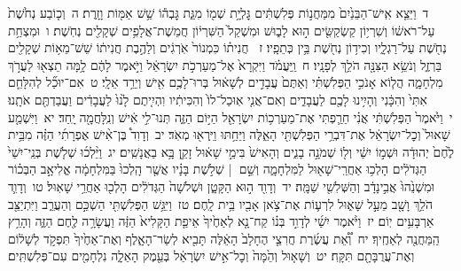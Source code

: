 \documentclass[18pt]{article}
\newcommand{\kri}[1]{\Afootnote{#1}}	%
\begin{document}
 {\loc ד~}וַיֵּצֵ֤א אִֽישׁ־הַבֵּנַ֙יִם֙ מִמַּחֲנ֣וֹת פְּלִשְׁתִּ֔ים גׇּלְיָ֥ת שְׁמ֖וֹ מִגַּ֑ת גׇּבְה֕וֹ שֵׁ֥שׁ אַמּ֖וֹת וָזָֽרֶת׃ \startlock
 {\loc ה~}וְכ֤וֹבַע נְחֹ֙שֶׁת֙ עַל־רֹאשׁ֔וֹ וְשִׁרְי֥וֹן קַשְׂקַשִּׂ֖ים ה֣וּא לָב֑וּשׁ וּמִשְׁקַל֙ הַשִּׁרְי֔וֹן חֲמֵשֶׁת־אֲלָפִ֥ים שְׁקָלִ֖ים נְחֹֽשֶׁת׃ \startlock
 {\loc ו~}וּמִצְחַ֥ת נְחֹ֖שֶׁת עַל־רַגְלָ֑יו וְכִיד֥וֹן נְחֹ֖שֶׁת בֵּ֥ין כְּתֵפָֽיו׃ \startlock
 {\loc ז~}\edtext{(וחץ)}{\kri{קרי: וְעֵ֣ץ}}  חֲנִית֗וֹ כִּמְנוֹר֙ אֹֽרְגִ֔ים וְלַהֶ֣בֶת חֲנִית֔וֹ שֵׁשׁ־מֵא֥וֹת שְׁקָלִ֖ים בַּרְזֶ֑ל וְנֹשֵׂ֥א הַצִּנָּ֖ה הֹלֵ֥ךְ לְפָנָֽיו׃ \startlock
 {\loc ח~}וַֽיַּעֲמֹ֗ד וַיִּקְרָא֙ אֶל־מַעַרְכֹ֣ת יִשְׂרָאֵ֔ל וַיֹּ֣אמֶר לָהֶ֔ם לָ֥מָּה תֵצְא֖וּ לַעֲרֹ֣ךְ מִלְחָמָ֑ה הֲל֧וֹא אָנֹכִ֣י הַפְּלִשְׁתִּ֗י וְאַתֶּם֙ עֲבָדִ֣ים לְשָׁא֔וּל בְּרוּ־לָכֶ֥ם אִ֖ישׁ וְיֵרֵ֥ד אֵלָֽי׃ \startlock
 {\loc ט~}אִם־יוּכַ֞ל לְהִלָּחֵ֤ם אִתִּי֙ וְהִכָּ֔נִי וְהָיִ֥ינוּ לָכֶ֖ם לַעֲבָדִ֑ים וְאִם־אֲנִ֤י אֽוּכַל־לוֹ֙ וְהִכִּיתִ֔יו וִהְיִ֤יתֶם לָ֙נוּ֙ לַעֲבָדִ֔ים וַעֲבַדְתֶּ֖ם אֹתָֽנוּ׃ \startlock
 {\loc י~}וַיֹּ֙אמֶר֙ הַפְּלִשְׁתִּ֔י אֲנִ֗י חֵרַ֛פְתִּי אֶת־מַעַרְכ֥וֹת יִשְׂרָאֵ֖ל הַיּ֣וֹם הַזֶּ֑ה תְּנוּ־לִ֣י אִ֔ישׁ וְנִֽלָּחֲמָ֖ה יָֽחַד׃ \startlock
 {\loc יא~}וַיִּשְׁמַ֤ע שָׁאוּל֙ וְכׇל־יִשְׂרָאֵ֔ל אֶת־דִּבְרֵ֥י הַפְּלִשְׁתִּ֖י הָאֵ֑לֶּה וַיֵּחַ֥תּוּ וַיִּֽרְא֖וּ מְאֹֽד׃ \startlock
 {\loc יב~}וְדָוִד֩ בֶּן־אִ֨ישׁ אֶפְרָתִ֜י הַזֶּ֗ה מִבֵּ֥ית לֶ֙חֶם֙ יְהוּדָ֔ה וּשְׁמ֣וֹ יִשַׁ֔י וְל֖וֹ שְׁמֹנָ֣ה בָנִ֑ים וְהָאִישׁ֙ בִּימֵ֣י שָׁא֔וּל זָקֵ֖ן בָּ֥א בַאֲנָשִֽׁים׃ \startlock
 {\loc יג~}וַיֵּ֨לְכ֜וּ שְׁלֹ֤שֶׁת בְּנֵֽי־יִשַׁי֙ הַגְּדֹלִ֔ים הָלְכ֥וּ אַחֲרֵֽי־שָׁא֖וּל לַמִּלְחָמָ֑ה וְשֵׁ֣ם  |  שְׁלֹ֣שֶׁת בָּנָ֗יו אֲשֶׁ֤ר הָֽלְכוּ֙ בַּמִּלְחָמָ֔ה אֱלִיאָ֣ב הַבְּכ֗וֹר וּמִשְׁנֵ֙הוּ֙ אֲבִ֣ינָדָ֔ב וְהַשְּׁלִשִׁ֖י שַׁמָּֽה׃ \startlock
 {\loc יד~}וְדָוִ֖ד ה֣וּא הַקָּטָ֑ן וּשְׁלֹשָׁה֙ הַגְּדֹלִ֔ים הָלְכ֖וּ אַחֲרֵ֥י שָׁאֽוּל׃ \startlock
 {\loc טו~}וְדָוִ֛ד הֹלֵ֥ךְ וָשָׁ֖ב מֵעַ֣ל שָׁא֑וּל לִרְע֛וֹת אֶת־צֹ֥אן אָבִ֖יו בֵּ֥ית לָֽחֶם׃ \startlock
 {\loc טז~}וַיִּגַּ֥שׁ הַפְּלִשְׁתִּ֖י הַשְׁכֵּ֣ם וְהַעֲרֵ֑ב וַיִּתְיַצֵּ֖ב אַרְבָּעִ֥ים יֽוֹם׃ \startlock
 {\loc יז~}וַיֹּ֨אמֶר יִשַׁ֜י לְדָוִ֣ד בְּנ֗וֹ קַח־נָ֤א לְאַחֶ֙יךָ֙ אֵיפַ֤ת הַקָּלִיא֙ הַזֶּ֔ה וַעֲשָׂרָ֥ה לֶ֖חֶם הַזֶּ֑ה וְהָרֵ֥ץ הַֽמַּחֲנֶ֖ה לְאַחֶֽיךָ׃ \startlock
 {\loc יח~}וְ֠אֵ֠ת עֲשֶׂ֜רֶת חֲרִצֵ֤י הֶחָלָב֙ הָאֵ֔לֶּה תָּבִ֖יא לְשַׂר־הָאָ֑לֶף וְאֶת־אַחֶ֙יךָ֙ תִּפְקֹ֣ד לְשָׁל֔וֹם וְאֶת־עֲרֻבָּתָ֖ם תִּקָּֽח׃ \startlock
 {\loc יט~}וְשָׁא֤וּל וְהֵ֙מָּה֙ וְכׇל־אִ֣ישׁ יִשְׂרָאֵ֔ל בְּעֵ֖מֶק הָאֵלָ֑ה נִלְחָמִ֖ים עִם־פְּלִשְׁתִּֽים׃ \startlock
\end{document}
